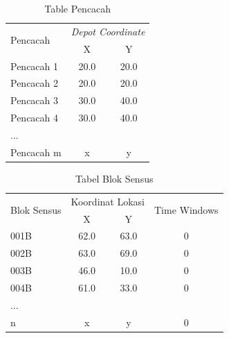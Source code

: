 \begin{table}[]
\centering
\caption{Table Pencacah}
\label{tbl:enumerators_overview}
\begin{tabular}{@{}lcc@{}}
\toprule
\multirow{2}{*}{Pencacah} & \multicolumn{2}{l}{\textit{Depot Coordinate}} \\ \cmidrule(l){2-3} 
                          & X                 & Y                \\ \midrule
Pencacah 1                & 20.0              & 20.0             \\
Pencacah 2                & 20.0              & 20.0             \\
Pencacah 3                & 30.0              & 40.0             \\
Pencacah 4                & 30.0              & 40.0             \\
...                       &                   &                  \\
Pencacah m                & x                 & y                \\ \bottomrule
\end{tabular}
\end{table}


\begin{table}[]
\centering
\caption{Tabel Blok Sensus}
\label{tbl:census_blocks}
\begin{tabular}{@{}lccc@{}}
\toprule
\multirow{2}{*}{Blok Sensus} & \multicolumn{2}{c}{Koordinat Lokasi} & \multirow{2}{*}{Time Windows} \\ \cmidrule(lr){2-3}
                             & X                 & Y                &                               \\ \midrule
001B                         & 62.0              & 63.0             & 0                             \\
002B                         & 63.0              & 69.0             & 0                             \\
003B                         & 46.0              & 10.0             & 0                             \\
004B                         & 61.0              & 33.0             & 0                             \\
...                          &                   &                  &                               \\
n                            & x                 & y                & 0                             \\ \bottomrule
\end{tabular}
\end{table}


